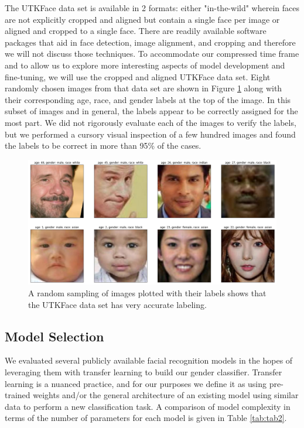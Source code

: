 \documentclass[obeyspaces, spaces, fleqn,10pt]{SelfArx} %
\begin{document}
The UTKFace data set is available in 2 formats: either "in-the-wild" wherein faces are not explicitly cropped and aligned but contain a single face per image or aligned and cropped to a single face. There are readily available software packages that aid in face detection, image alignment, and cropping and therefore we will not discuss those techniques.\cite{dlib09,mtcnn} To accommodate our compressed time frame and to allow us to explore more interesting aspects of model development and fine-tuning, we will use the cropped and aligned UTKFace data set. Eight randomly chosen images from that data set are shown in Figure \ref{fig:fig1} along with their corresponding age, race, and gender labels at the top of the image. In this subset of images and in general, the labels appear to be correctly assigned for the most part. We did not rigorously evaluate each of the images to verify the labels, but we performed a cursory visual inspection of a few hundred images and found the labels to be correct in more than 95\% of the cases.

\begin{figure}[ht]\centering %
\includegraphics[width=\linewidth]{img/UTKfaces_labelverification}
\caption{A random sampling of images plotted with their labels shows that the UTKFace data set has very accurate labeling.}
\label{fig:fig1}
\end{figure}

\subsection{Model Selection}
We evaluated several publicly available facial recognition models in the hopes of leveraging them with transfer learning to build our gender classifier. Transfer learning is a nuanced practice, and for our purposes we define it as using pre-trained weights and/or the general architecture of an existing model using similar data to perform a new classification task.\cite{brownlee:transfer,sarkar} A comparison of model complexity in terms of the number of parameters for each model is given in Table \ref{tab:tab2}. 
\end{document}
